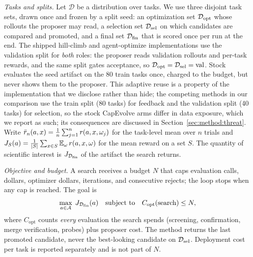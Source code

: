 \emph{Tasks and splits.}
Let $\mathcal{D}$ be a distribution over tasks. We use three disjoint task sets, drawn once and frozen by a split seed:
an optimization set $\mathcal{D}_{\mathrm{opt}}$ whose rollouts the proposer may read, a selection set $\mathcal{D}_{\mathrm{sel}}$ on which candidates are
compared and promoted, and a final set $\mathcal{D}_{\mathrm{fin}}$ that is scored once per run at the end.
The shipped hill-climb and agent-optimize implementations use the validation split for \emph{both} roles: the
proposer reads validation rollouts and per-task rewards, and the same split gates acceptance, so
$\mathcal{D}_{\mathrm{opt}}=\mathcal{D}_{\mathrm{sel}}=\mathrm{val}$. Stock \capevolve{} evaluates the seed artifact on the 80 train tasks once, charged to the budget, but never shows them to the proposer. This adaptive reuse is a property of the implementation that
we disclose rather than hide; the competing methods in our comparison use the train split (80 tasks) for feedback and the
validation split (40 tasks) for selection, so the stock CapEvolve arms differ in data exposure, which we report as such; its consequences are discussed in Section~\ref{sec:method:threat}.
Write $\bar r_n(a,x)=\frac1n\sum_{j=1}^{n}r(a,x,\omega_j)$ for the task-level mean over $n$ trials and
$J_{S}(a)=\frac1{|S|}\sum_{x\in S}\mathbb{E}_\omega\, r(a,x,\omega)$ for the mean reward on a set $S$.
The quantity of scientific interest is $J_{\mathcal{D}_{\mathrm{fin}}}$ of the artifact the search returns.

\emph{Objective and budget.}
A search receives a budget $N$ that caps evaluation calls, dollars, optimizer dollars, iterations, and consecutive
rejects; the loop stops when any cap is reached.
The goal is
\begin{equation}
  \max_{a\in\mathcal{A}}\; J_{\mathcal{D}_{\mathrm{fin}}}(a)
  \quad\text{subject to}\quad C_{\mathrm{opt}}(\text{search})\le N,
\end{equation}
where $C_{\mathrm{opt}}$ counts \emph{every} evaluation the search spends (screening, confirmation, merge verification,
probes) plus proposer cost. The method returns the last promoted candidate, never the best-looking candidate on
$\mathcal{D}_{\mathrm{sel}}$. Deployment cost per task is reported separately and is not part of $N$.

